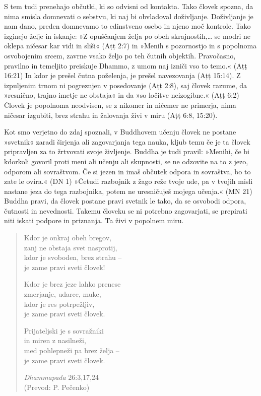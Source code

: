 S tem tudi prenehajo občutki, ki so odvisni od kontakta. Tako človek
spozna, da nima smisla domnevati o sebstvu, ki naj bi obvladoval
doživljanje. Doživljanje je nam dano, preden domnevamo to edinstveno
osebo in njeno moč kontrole. Tako izginejo želje in iskanje: »Z
opuščanjem želja po obeh skrajnostih,\ldots{} se modri ne oklepa ničesar
kar vidi in sliši« (Aṭṭ 2:7) in »Menih s pozornostjo in s popolnoma
osvobojenim srcem, zavrne vsako željo po teh čutnih objektih.
Pravočasno, pravilno in temeljito preiskuje Dhammo, z umom naj izniči
vso to temo.« (Aṭṭ 16:21) In kdor je prešel čutna poželenja, je prešel
navezovanja (Aṭṭ 15:14). Z izpuljenim trnom ni pogreznjen v posedovanje
(Aṭṭ 2:8), saj človek razume, da »resnično, trajno imetje ne obstaja« in
da »so ločitve neizogibne.« (Aṭṭ 6:2) Človek je popolnoma neodvisen, se
z nikomer in ničemer ne primerja, nima ničesar izgubiti, brez strahu in
žalovanja živi v miru (Aṭṭ 6:8, 15:20).

Kot smo verjetno do zdaj spoznali, v Buddhovem učenju človek ne postane
»svetnik« zaradi širjenja ali zagovarjanja tega nauka, kljub temu če je
ta človek pripravljen za to žrtvovati svoje življenje. Buddha je tudi
pravil: »Menihi, če bi kdorkoli govoril proti meni ali učenju ali
skupnosti, se ne odzovite na to z jezo, odporom ali sovraštvom. Če si
jezen in imaš občutek odpora in sovraštva, bo to zate le ovira.« (DN 1)
»Četudi razbojnik z žago reže tvoje ude, pa v tvojih misli nastane jeza
do tega razbojnika, potem ne uresničuješ mojega učenja.« (MN 21) Buddha
pravi, da človek postane pravi svetnik le tako, da se osvobodi odpora,
čutnosti in nevednosti. Takemu človeku se ni potrebno zagovarjati, se
prepirati niti iskati podpore in priznanja. Ta živi v popolnem miru.

\begin{quote}
Kdor je onkraj obeh bregov,\\
zanj ne obstaja svet nasprotij,\\
kdor je svoboden, brez strahu --\\
je zame pravi sveti človek!

Kdor je brez jeze lahko prenese\\
zmerjanje, udarce, muke,\\
kdor je res potrpežljiv,\\
je zame pravi sveti človek.

Prijateljski je s sovražniki\\
in miren z nasilneži,\\
med pohlepneži pa brez želja --\\
je zame pravi sveti človek.

\emph{Dhammapada} 26:3,17,24\\
(Prevod: P. Pečenko)
\end{quote}

